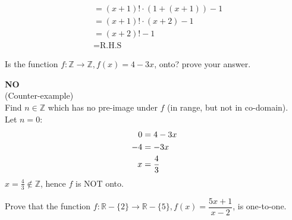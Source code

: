 \documentclass[answers]{exam}
\begin{document}
\begin{questions}
\begin{solutionorbox}[19cm]
\begin{align*}
                                                                 & = (x + 1)! \cdot (1 + (x+1)) - 1 \tag{Simplify}                                  \\
                                                                 & = (x + 1)! \cdot (x + 2) - 1 \tag{Simplify}                                      \\
                                                                 & = (x + 2)! - 1 \tag{Factorial Simplification}                                    \\
                                                                 & = \text{R.H.S} \tag{Proven}
            \end{align*}
        \end{solutionorbox}
    
    \question Is the function $f : \mathbb{Z} \longrightarrow \mathbb{Z}, f(x) = 4 - 3x$, onto? prove your answer.
    
    
        \begin{solutionorbox}[7cm]
            \textbf{NO}\\
            (Counter-example)\\
            Find $n \in \mathbb{Z}$ which has no pre-image under $f$ (in range, but not in co-domain).\\
            Let $n = 0$:
            \begin{align}
                0    & = 4 - 3x \notag      \\
                -4   & = -3x \notag         \\
                x    & = \frac{4}{3} \notag
            \end{align}
            $x = \frac{4}{3} \notin \mathbb{Z}$, hence $f$ is NOT onto.
        \end{solutionorbox}
    
    \question Prove that the function $f : \mathbb{R} - \{ 2 \} \longrightarrow \mathbb{R} - \{ 5 \}, f(x) = \dfrac{5x + 1}{x - 2}$, is one-to-one.
    

\end{questions}
\end{document}
